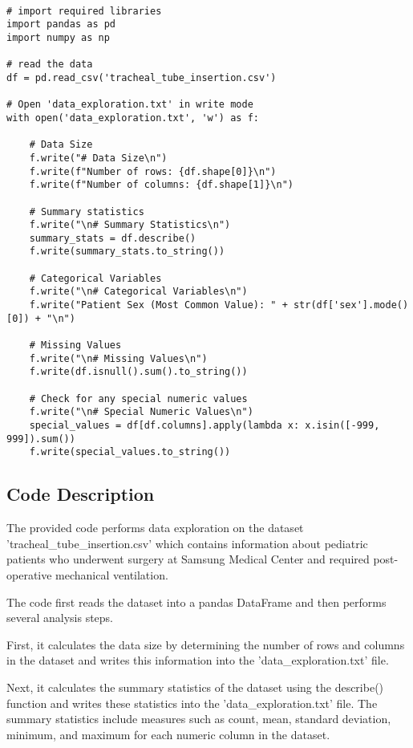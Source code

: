 \documentclass[11pt]{article}
\begin{document}
\begin{verbatim}

# import required libraries
import pandas as pd
import numpy as np

# read the data
df = pd.read_csv('tracheal_tube_insertion.csv')

# Open 'data_exploration.txt' in write mode 
with open('data_exploration.txt', 'w') as f:
    
    # Data Size
    f.write("# Data Size\n")
    f.write(f"Number of rows: {df.shape[0]}\n")
    f.write(f"Number of columns: {df.shape[1]}\n")

    # Summary statistics
    f.write("\n# Summary Statistics\n")
    summary_stats = df.describe()
    f.write(summary_stats.to_string())
    
    # Categorical Variables
    f.write("\n# Categorical Variables\n")
    f.write("Patient Sex (Most Common Value): " + str(df['sex'].mode()[0]) + "\n")

    # Missing Values
    f.write("\n# Missing Values\n")
    f.write(df.isnull().sum().to_string())
    
    # Check for any special numeric values
    f.write("\n# Special Numeric Values\n")
    special_values = df[df.columns].apply(lambda x: x.isin([-999, 999]).sum())
    f.write(special_values.to_string())

\end{verbatim}

\subsection{Code Description}

The provided code performs data exploration on the dataset 'tracheal\_tube\_insertion.csv' which contains information about pediatric patients who underwent surgery at Samsung Medical Center and required post-operative mechanical ventilation. 

The code first reads the dataset into a pandas DataFrame and then performs several analysis steps. 

First, it calculates the data size by determining the number of rows and columns in the dataset and writes this information into the 'data\_exploration.txt' file. 

Next, it calculates the summary statistics of the dataset using the describe() function and writes these statistics into the 'data\_exploration.txt' file. The summary statistics include measures such as count, mean, standard deviation, minimum, and maximum for each numeric column in the dataset.
\end{document}
